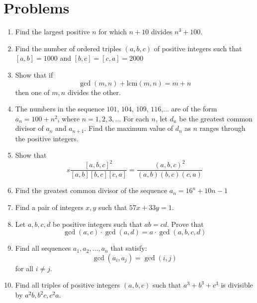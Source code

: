 \documentclass[11pt]{article}
\theoremstyle{theorem}
\theoremstyle{definition}
\theoremstyle{remark}
\theoremstyle{definition}
\theoremstyle{remark}
\newcommand{\lcm}[0]{\text{lcm}}
\begin{document}
\section{Problems}
\begin{enumerate}
\item Find the largest positive $n$ for which $n+10$ divides $n^3+100$.
\item Find the number of ordered triples $(a,b,c)$ of positive integers such that $[a,b]=1000$ and $[b,c]=[c,a]=2000$
\item Show that if 
\begin{equation*}
\gcd(m,n)+\lcm(m,n)=m+n
\end{equation*}
then one of $m,n$ divides the other.
\item The numbers in the sequence $\displaystyle 101$, $\displaystyle 104$, $\displaystyle 109$, $\displaystyle 116$,$\displaystyle \ldots$ are of the form $\displaystyle a_n=100+n^2$, where $\displaystyle n=1,2,3,\ldots$ For each $\displaystyle n$, let $\displaystyle d_n$ be the greatest common divisor of $\displaystyle a_n$ and $\displaystyle a_{n+1}$. Find the maximum value of $\displaystyle d_n$ as $\displaystyle n$ ranges through the positive integers.
\item Show that 
\begin{equation*}s
\frac{[a,b,c]^2}{[a,b][b,c][c,a]} = \frac{(a,b,c)^2}{(a,b)(b,c)(c,a)}
\end{equation*}
\item Find the greatest common divisor of the sequence $a_n=16^n +10n-1$
\item Find a pair of integers $x,y$ such that $57x+33y=1$.
\item Let $a,b,c,d$ be positive integers such that $ab=cd$. Prove that
\begin{equation*}
\gcd(a,c)\cdot\gcd(a,d)=a\cdot\gcd(a,b,c,d)
\end{equation*}
\item Find all sequences $a_1, a_2,\ldots, a_n$ that satisfy:
\begin{equation*}
\gcd(a_i,a_j) = \gcd(i,j)
\end{equation*}
for all $i\neq j$. 
\item Find all triples of positive integers $(a,b,c)$ such that $a^3+b^3+c^3$ is divisible by $a^2b, b^2c, c^2a$.
\end{enumerate}
\end{document}
